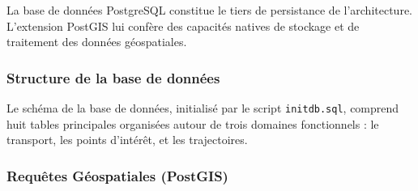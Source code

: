 \documentclass[french]{tai_info} %
\begin{document}
La base de données PostgreSQL constitue le tiers de persistance de l'architecture. L'extension PostGIS lui confère des capacités natives de stockage et de traitement des données géospatiales.

\subsubsection{Structure de la base de données}

Le schéma de la base de données, initialisé par le script \texttt{initdb.sql}, comprend huit tables principales organisées autour de trois domaines fonctionnels : le transport, les points d'intérêt, et les trajectoires.

\begin{table}[htbp]
    \centering
    \caption{Structure des tables de la base de données.}
    \label{tab:db_structure}
\end{table}

\subsubsection{Requêtes Géospatiales (PostGIS)}
\end{document}
